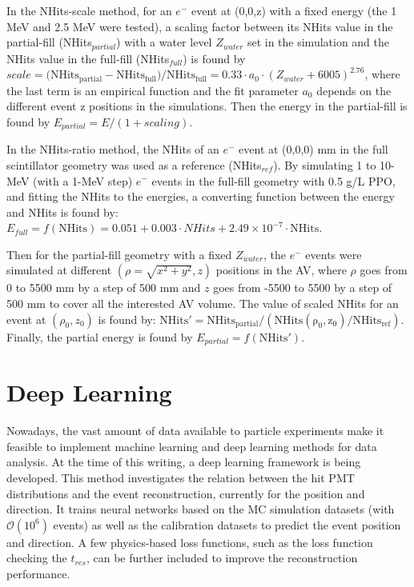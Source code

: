 In the NHits-scale method, for an $e^-$ event at (0,0,z) with a fixed energy (the 1 MeV and 2.5 MeV were tested), a scaling factor between its NHits value in the partial-fill (NHits$_{partial}$) with a water level $Z_{water}$ set in the simulation and the NHits value in the full-fill (NHits$_{full}$) is found by $scale = (\mathrm{NHits_{partial} - NHits_{full})/NHits_{full}} = 0.33\cdot a_0\cdot (Z_{water}+6005)^{2.76}$, where the last term is an empirical function and the fit parameter $a_0$ depends on the different event z positions in the simulations. Then the energy in the partial-fill is found by $E_{partial} = E/(1 + scaling)$\cite{partialEnergy, jiePartialEnergy}.
 
In the NHits-ratio method, the NHits of an $e^-$ event at (0,0,0) mm in the full scintillator geometry was used as a reference (NHits$_{ref}$). By simulating 1 to 10-MeV (with a 1-MeV step) $e^-$ events in the full-fill geometry with 0.5 g/L PPO, and fitting the NHits to the energies, a converting function between the energy and NHits is found by: $E_{full} = f(\mathrm{NHits})=0.051+0.003\cdot NHits+2.49\times10^{-7}\cdot \mathrm{NHits}$\cite{jiePartialEnergyNhitRatio}.

Then for the partial-fill geometry with a fixed $Z_{water}$, the $e^-$ events were simulated at different $(\rho=\sqrt{x^2+y^2},z)$ positions in the AV, where $\rho$ goes from 0 to 5500 mm by a step of 500 mm and $z$ goes from -5500 to 5500 by a step of 500 mm to cover all the interested AV volume. The value of scaled NHits for an event at $(\rho_0,z_0)$ is found by: $\mathrm{NHits' = NHits_{partial}/(NHits(\rho_0,z_0)/NHits_{ref})}$.
Finally, the partial energy is found by $E_{partial} = f(\mathrm{NHits'})$\cite{jiePartialEnergyNhitRatio}.

\section{Deep Learning}
Nowadays, the vast amount of data available to particle experiments make it feasible to implement machine learning and deep learning methods for data analysis. At the time of this writing, a deep learning framework is being developed\cite{markMachineLearning,markNeuralTalk,markNeuralNetwork}. This method investigates the relation between the hit PMT distributions and the event reconstruction, currently for the position and direction. It trains neural networks based on the MC simulation datasets (with $\mathcal{O}(10^6)$ events) as well as the calibration datasets to predict the event position and direction\cite{markNeuralTalk}. A few physics-based loss functions, such as the loss function checking the $t_{res}$, can be further included to improve the reconstruction performance\cite{markNeuralTalk}. 

